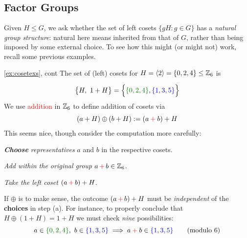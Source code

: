 \clearpage

\subsection{Factor Groups}\label{sec:factor}

Given $H\le G$, we ask whether the set of left cosets $\{gH:g\in G\}$ has a \emph{natural group structure}: natural here means inherited from that of $G$, rather than being imposed by some external choice. To see how this might (or might not) work, recall some previous examples.

\begin{examples*}{\ref{ex:cosetexs}, cont}{}
	\exstart The set of (left) cosets for $H=\left\langle 2\right\rangle=\{0,2,4\}\le\mathbb{Z}_6$ is
	\begin{enumerate}\setcounter{enumi}{1}
		\begin{minipage}[t]{0.7\linewidth}\vspace{-15pt}
		  \item[] 
			\[
				\bigl\{
					H,\ 1+H
				\bigr\}
				=\Bigl\{
					\textcolor{Green}{\{0,2,4\}}, \textcolor{blue}{\{1,3,5\}}
				\Bigr\}
			\]
			We use \textcolor{red}{addition} in $\mathbb{Z}_6$ to define addition of cosets via
			\[
				(a+H)\oplus(b+H):=(a\mathbin{\textcolor{red}{+}}b)+H
			\]
			This seems nice, though consider the computation more carefully:\vspace{-2pt}
		  \begin{enumeratea}
				\item \emph{\textbf{Choose} representatives} $a$ and $b$ in the respective cosets.
				\item \emph{Add within the original group} $a\operatorname{\textcolor{red}{+}}b\in\mathbb{Z}_6$.
				\item \emph{Take the left coset} $(a\operatorname{\textcolor{red}{+}}b)+H$.
			\end{enumeratea}
			If $\oplus$ is to make sense, the outcome $(a\operatorname{\textcolor{red}{+}}b)+H$ must be \emph{independent} of the \textbf{choices} in step (a). For instance, to properly conclude that $H\oplus(1+H)=1+H$ we must check \emph{nine} possibilities:
			\[
				a\in \textcolor{Green}{\{0,2,4\}},\  b\in\textcolor{blue}{\{1,3,5\}} \implies a\mathbin{\textcolor{red}{+}} b\in\textcolor{blue}{\{1,3,5\}} \tag{modulo 6}
			\]
		\end{minipage}
		\hfill
		\begin{minipage}[t]{0.25\linewidth}\vspace{-2pt}

\end{minipage}
\end{enumerate}
\end{examples*}
